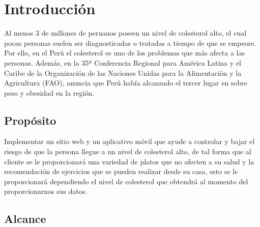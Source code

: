 \chapter{Introducción}

Al menos 3 de millones de peruanos poseen un nivel de colesterol alto, el cual pocas personas suelen ser diagnosticadas o tratadas a tiempo de que se empeore. Por ello, en el Perú el colesterol es uno de los problemas que más afecta a las personas. Además, en la 35ª Conferencia Regional para América Latina y el Caribe de la Organización de las Naciones Unidas para la Alimentación y la Agricultura (FAO), anuncia que Perú había alcanzado el tercer lugar en sobre peso y obesidad en la región.

\section{Propósito}

Implementar un sitio web y un aplicativo móvil que ayude a controlar y bajar el riesgo de que la persona llegue a un nivel de colesterol alto, de tal forma que al cliente se le proporcionará una variedad de platos que no afecten a su salud y la recomendación de ejercicios que se pueden realizar desde su casa, esto se le proporcionará dependiendo el nivel de colesterol que obtendrá al momento del proporcionarnos sus datos.

\section{Alcance}


